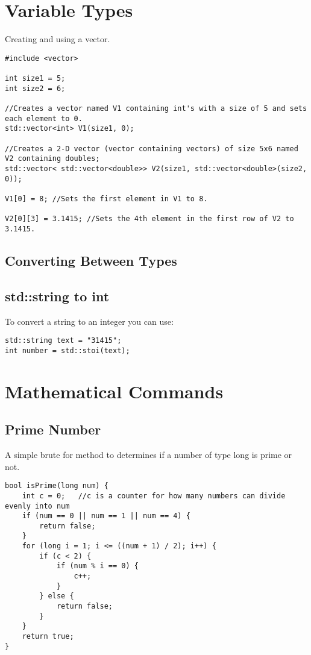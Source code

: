 \section{Variable Types}

Creating and using a vector.
\begin{lstlisting}
#include <vector>

int size1 = 5;
int size2 = 6;

//Creates a vector named V1 containing int's with a size of 5 and sets each element to 0. 
std::vector<int> V1(size1, 0); 

//Creates a 2-D vector (vector containing vectors) of size 5x6 named V2 containing doubles;
std::vector< std::vector<double>> V2(size1, std::vector<double>(size2, 0)); 

V1[0] = 8; //Sets the first element in V1 to 8.

V2[0][3] = 3.1415; //Sets the 4th element in the first row of V2 to 3.1415.

\end{lstlisting}


\subsection{Converting Between Types}

\subsection*{std::string to int}
To convert a string to an integer you can use:
\begin{lstlisting}
std::string text = "31415";
int number = std::stoi(text);
\end{lstlisting}

\section{Mathematical Commands}

\subsection*{Prime Number}
A simple brute for method to determines if a number of type long is prime or not.
\begin{lstlisting}
bool isPrime(long num) {  
	int c = 0;   //c is a counter for how many numbers can divide evenly into num
	if (num == 0 || num == 1 || num == 4) {
		return false;
	}
	for (long i = 1; i <= ((num + 1) / 2); i++) {
		if (c < 2) {
			if (num % i == 0) {
				c++;
			}
		} else {
			return false;
		}
	}
	return true;
}
\end{lstlisting}

